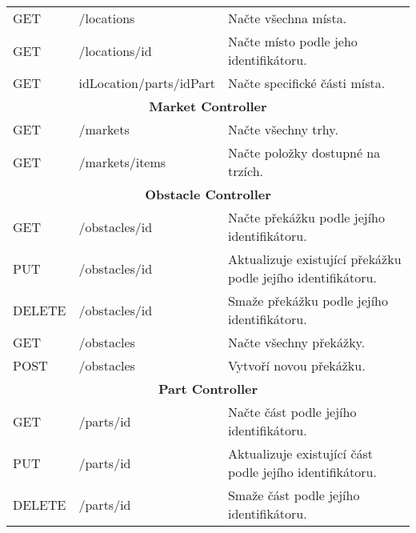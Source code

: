 \begin{longtable}{|l|l|p{}|}
    \hline
    GET             & /locations                  & Načte všechna místa.                                                \\
    GET             & /locations/{id}             & Načte místo podle jeho identifikátoru.                              \\
    GET             & {idLocation}/parts/{idPart} & Načte specifické části místa.                                       \\%
    \hline
    \multicolumn{3}{|c|}{\textbf{Market Controller}}                                                                    \\
    \hline
    GET             & /markets                    & Načte všechny trhy.                                                 \\
    GET             & /markets/items              & Načte položky dostupné na trzích.                                   \\
    \hline
    \multicolumn{3}{|c|}{\textbf{Obstacle Controller}}                                                                  \\
    \hline
    GET             & /obstacles/{id}             & Načte překážku podle jejího identifikátoru.                         \\
    PUT             & /obstacles/{id}             & Aktualizuje existující překážku podle jejího identifikátoru.        \\
    DELETE          & /obstacles/{id}             & Smaže překážku podle jejího identifikátoru.                         \\
    GET             & /obstacles                  & Načte všechny překážky.                                             \\
    POST            & /obstacles                  & Vytvoří novou překážku.                                             \\
    \hline
    \multicolumn{3}{|c|}{\textbf{Part Controller}}                                                                      \\
    \hline
    GET             & /parts/{id}                 & Načte část podle jejího identifikátoru.                             \\
    PUT             & /parts/{id}                 & Aktualizuje existující část podle jejího identifikátoru.            \\
    DELETE          & /parts/{id}                 & Smaže část podle jejího identifikátoru.                             \\

\end{longtable}

